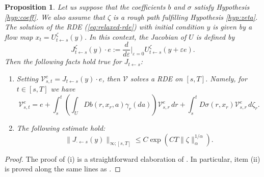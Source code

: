 \documentclass[12pt,reqno]{amsart}
\numberwithin{equation}{section}  %
\newcommand{\1}{{\bf 1}}
\newcommand{\2}{{\bf 2}}
\newcommand{\al}{\alpha}
\newtheorem{proposition}[theorem]{Proposition}
\theoremstyle{remark}
\theoremstyle{remark}
\begin{document}
\begin{proposition}\label{prop: Flow and Jacobian}
    Let us suppose that the coefficients $b$ and $\sigma$ satisfy Hypothesis \ref{hyp:coeff}. We also assume that $\zeta$ is a rough path fulfilling Hypothesis \ref{hyp:zeta}. The solution of the RDE (\ref{eq:relaxed-rde}) with initial condition $y$ is given by a flow map $x_{t}=U_{t\leftarrow s}^{\zeta}(y)$. In this context, the Jacobian of $U$ is defined by
    \[J_{t\leftarrow s}^{\zeta}(y)\cdot e := \frac{d}{d\varepsilon}\bigg|_{\varepsilon=0}U_{t\leftarrow s}^{\zeta}(y+\varepsilon e) .\]
    Then the following facts hold true for $J_{t\leftarrow s}$:
\begin{enumerate}[wide, labelwidth=!, labelindent=0pt, label=\textnormal{(\roman*)}]
\setlength\itemsep{.1in}    

\item Setting $\mathcal{V}_{s,t}^{e}=J_{t\leftarrow s}(y)\cdot e$, then $\mathcal{V}$ solves a RDE on $[s,T]$. Namely, for $t\in [s,T]$ we have 
    \begin{equation}\label{eq: Jacobian-RDE}
        \mathcal{V}_{s,t}^{e}=e + \int_{s}^{t}\left(\int_{U}Db(r,x_{r},a)\gamma_{r}(da) \right) \mathcal{V}_{s,r}^{e}\,dr +\int_{s}^{t}D\sigma (r,x_{r})\mathcal{V}_{s,r}^{e}\, d\zeta_{r}.
    \end{equation}


  \item The following estimate hold:
    \begin{equation} \label{ineq: Jacob}
        \|J_{\cdot \leftarrow s}(y)\|_{\infty;[s,T]}\leq C\exp{(CT\|\zeta\|_{\alpha}^{1/\al})} . \end{equation}
      \end{enumerate}
\end{proposition}
\begin{proof}
   The proof of (i) is a straightforward elaboration of \cite[Chapter 11]{friz-victoir}. In particular, item (ii) is proved along the same lines as \cite[Proposition 11.13]{friz-victoir}. 
   \end{proof}
\end{document}
